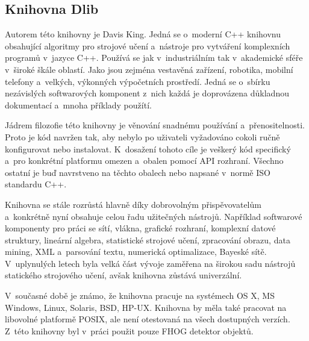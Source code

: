 \subsection{Knihovna Dlib}
Autorem této knihovny je Davis King. Jedná se o~moderní C++ knihovnu obsahující algoritmy pro strojové učení a~nástroje pro vytváření komplexních programů v~jazyce C++. Používá se jak v~industriálním tak v~akademické sféře v~široké škále oblastí. Jako jsou zejména vestavěná zařízení, robotika, mobilní telefony a~velkých, výkonných výpočetních prostředí. Jedná se o~sbírku nezávislých softwarových komponent z~nich každá je doprovázena důkladnou dokumentací a~mnoha příklady použítí.

Jádrem filozofie této knihovny je věnování snadnému používání a~přenositelnosti. Proto je kód navržen tak, aby nebylo po uživateli vyžadováno cokoli ručně konfigurovat nebo instalovat. K~dosažení tohoto cíle je veškerý kód specifický a~pro konkrétní platformu omezen a~obalen pomocí API rozhraní. Všechno ostatní je buď navrstveno na těchto obalech nebo napsané v~normě ISO standardu C++. 

Knihovna se stále rozrůstá hlavně díky dobrovolným přispěvovatelům a~konkrétně nyní obsahuje celou řadu užitečných nástrojů. Například softwarové komponenty pro práci se sítí, vlákna, grafické rozhraní, komplexní datové struktury, lineární algebra, statistické strojové učení, zpracování obrazu, data mining, XML a~parsování textu, numerická optimalizace, Bayeské sítě. V~uplynulých letech byla velká část vývoje zaměřena na širokou sadu nástrojů statického strojového učení, avšak knihovna zůstává univerzální.  

V~současné době je známo, že knihovna pracuje na systémech OS X, MS Windows, Linux, Solaris, BSD, HP-UX. Knihovna by měla také pracovat na libovolné platformě POSIX, ale není otestovaná na všech dostupných verzích. 
Z~této knihovny byl v~práci použit pouze FHOG detektor objektů.


